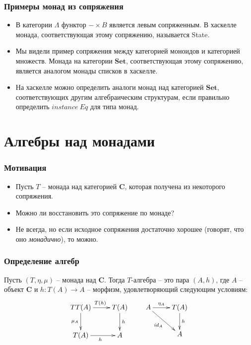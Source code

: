 \documentclass{beamer}
\theoremstyle{definition}
\newcommand{\cat}[1]{\mathbf{#1}}
\renewcommand{\C}{\cat{C}}
\newcommand{\Set}{\cat{Set}}
\begin{document}
\begin{frame}
\frametitle{Примеры монад из сопряжения}
\begin{itemize}
\item В категории $\Lambda$ функтор $- \times B$ является левым сопряженным.
В хаскелле монада, соответствующая этому сопряжению, называется State.
\item Мы видели пример сопряжения между категорией моноидов и категорией множеств.
Монада на категории $\Set$, соответствующая этому сопряжению, является аналогом монады списков в хаскелле.
\item На хаскелле можно определить аналоги монад над категорией $\Set$, соответствующих другим алгебраическим структурам,
если правильно определить $\mathit{instance}\ \mathit{Eq}$ для типа монад.
\end{itemize}
\end{frame}

\section{Алгебры над монадами}

\begin{frame}
\frametitle{Мотивация}
\begin{itemize}
\item Пусть $T$ -- монада над категорией $\C$, которая получена из некоторого сопряжения.
\item Можно ли восстановить это сопряжение по монаде?
\item Не всегда, но если исходное сопряжения достаточно хорошее (говорят, что оно \emph{монадично}), то можно.
\end{itemize}
\end{frame}

\begin{frame}
\frametitle{Определение алгебр}
\begin{defn}
Пусть $(T,\eta,\mu)$ -- монада над $\C$.
Тогда $T$-алгебра -- это пара $(A,h)$, где $A$ -- объект $\C$ и $h : T(A) \to A$ -- морфизм, удовлетворяющий следующим условиям:
\[ \xymatrix{ TT(A) \ar[r]^{T(h)} \ar[d]_{\mu_A} & T(A) \ar[d]^h \\
              T(A) \ar[r]_h                      & A
            }
\qquad
   \xymatrix{ A \ar[r]^-{\eta_A} \ar[rd]_{id_A} & T(A) \ar[d]^h \\
                                                & A
            } \]
\end{defn}
\end{frame}
\end{document}
